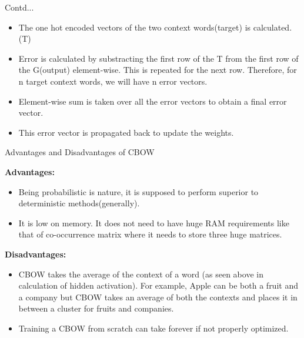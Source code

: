 \documentclass{beamer}
\newcommand\myheading[1]{%
  \par\bigskip
  {\Large\bfseries#1}\par\smallskip}
\begin{document}
\begin{frame}{Contd...}
	\begin{flushleft}
\begin{itemize}
	\item The one hot encoded vectors of the two context words(target) is calculated. (T)
			\item Error is calculated by substracting the first row of the T from the first row of the G(output) element-wise. This is repeated for the next row. Therefore, for n target context words, we will have n error vectors.
			\item Element-wise sum is taken over all the error vectors to obtain a final error vector.
			\item This error vector is propagated back to update the weights.
			\end{itemize}
\end{flushleft}
\end{frame}
\begin{frame}{Advantages and Disadvantages of CBOW}
	\begin{flushleft}
\myheading{Advantages:}
	\begin{itemize}
	\item Being probabilistic is nature, it is supposed to perform superior to deterministic methods(generally).
	\item It is low on memory. It does not need to have huge RAM requirements like that of co-occurrence matrix where it needs to store three huge matrices.
	\end{itemize}
\myheading{Disadvantages:}
	\begin{itemize}
	\item CBOW takes the average of the context of a word (as seen above in calculation of hidden activation). For example, Apple can be both a fruit and a company but CBOW takes an average of both the contexts and places it in between a cluster for fruits and companies.
	\item Training a CBOW from scratch can take forever if not properly optimized.
	\end{itemize}
\end{flushleft}
\end{frame}
\end{document}
